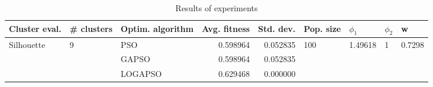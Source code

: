 \begin{table}
\centering
\caption{Results of experiments}
\begin{tabular}{lllrrllll}
\toprule
              Cluster eval. &        \# clusters & Optim. algorithm &  Avg. fitness &  Std. dev. &            Pop. size &               $\phi_{1}$ &         $\phi_{2}$ &                       w \\
\midrule
\multirow{3}{*}{Silhouette} & \multirow{3}{*}{9} &              PSO &      0.598964 &   0.052835 & \multirow{3}{*}{100} & \multirow{3}{*}{1.49618} & \multirow{3}{*}{1} & \multirow{3}{*}{0.7298} \\
                            &                    &            GAPSO &      0.598964 &   0.052835 &                      &                          &                    &                         \\
                            &                    &          LOGAPSO &      0.629468 &   0.000000 &                      &                          &                    &                         \\
\bottomrule
\end{tabular}
\end{table}
